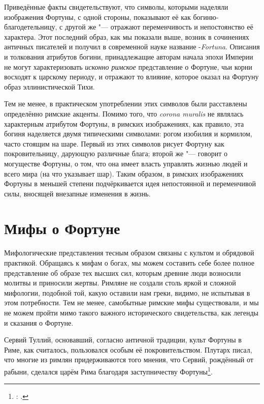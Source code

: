 Приведённые факты свидетельствуют, что символы, которыми наделяли изображения Фортуны, с одной стороны, показывают её как богиню-благодетельницу, с другой же "--- отражают переменчивость и непостоянство её характера. Этот последний образ, как мы показали выше, возник в сочинениях античных писателей и получил в современной науке название -\textit{Fortuna}. Описания и толкования атрибутов богини, принадлежащие авторам начала эпохи Империи не могут характеризовать \textit{исконно римское} представление о Фортуне, чьи корни восходят к царскому периоду, и отражают то влияние, которое оказал на Фортуну образ эллинистической Тихи.

Тем не менее, в практическом употреблении этих символов были расставлены определённо римские акценты. Помимо того, что \textit{corona muralis} не являлась характерным атрибутом Фортуны, в римских изображениях, как правило, эта богиня наделяется двумя типическими символами: рогом изобилия и кормилом, часто стоящим на шаре. Первый из этих символов рисует Фортуну как покровительницу, дарующую различные блага; второй же "--- говорит о могуществе Фортуны, о том, что она имеет власть управлять жизнью людей и всего мира (на что указывает шар). Таким образом, в римских изображениях Фортуны в меньшей степени подчёркивается идея непостоянной и переменчивой силы, вносящей внезапные изменения в жизнь.

\section{Мифы о Фортуне}\label{Myths}

Мифологические представления тесным образом связаны с культом и обрядовой практикой. Обращаясь к мифам о богах, мы можем составить себе более полное представление об образе тех высших сил, которым древние люди возносили молитвы и приносили жертвы. Римляне не создали столь яркой и сложной мифологии, подобной той, какую оставили нам греки, видимо, не испытывая в этом потребности. Тем не менее, самобытные римские мифы существовали, и мы не можем пройти мимо такого важного исторического свидетельства, как легенды и сказания о Фортуне.

Сервий Туллий, основавший, согласно античной традиции, культ Фортуны в Риме, как считалось, пользовался особым её покровительством. Плутарх писал, что многие из римлян придерживаются того мнения, что Сервий, рождённый от рабыни, сделался царём Рима благодаря заступничеству Фортуны\footnote{: .}.


